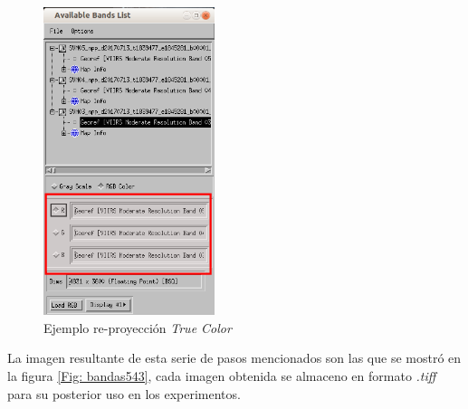 \begin{enumerate}
\begin{figure}[H]
 \centering
  \includegraphics[height=9cm,keepaspectratio=true,clip=true]{imagenes/RecolecciondeDatos/envi3.png}
  \caption{Ejemplo re-proyección \textit{True Color}}
	\label{Fig: envi3}
\end{figure}

\end{enumerate}

La imagen resultante de esta serie de pasos mencionados son las que se mostró en la figura \ref{Fig: bandas543}, cada imagen obtenida se almaceno en formato \textit{.tiff} para su posterior uso en los experimentos.